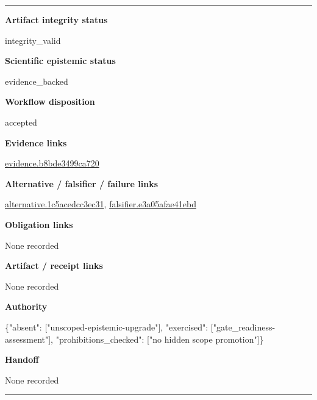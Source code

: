 \documentclass[10pt,a4paper]{article}
\newcommand{\TraceField}[2]{\par\noindent\textbf{#1}\par\noindent #2\par\smallskip}
\newenvironment{TraceDossier}{\par\medskip\noindent\hrule\medskip}{\medskip\hrule\par\medskip}
\begin{document}
\begin{TraceDossier}
\TraceField{Artifact integrity status}{integrity\_\allowbreak{}valid}

\TraceField{Scientific epistemic status}{evidence\_\allowbreak{}backed}

\TraceField{Workflow disposition}{accepted}

\TraceField{Evidence links}{\hyperlink{trace-evidence-8b260709dba789b7f5}{evidence.\allowbreak{}b8bde3499c\allowbreak{}a720}}

\TraceField{Alternative / falsifier / failure links}{\hyperlink{trace-alternative-4d037c4cc2fc7025d3}{alternativ\allowbreak{}e.\allowbreak{}1c5acedcc3\allowbreak{}ec31}, \hyperlink{trace-alternative-7d4cb1ab6ec072bc19}{falsifier.\allowbreak{}e3a05afae4\allowbreak{}1ebd}}

\TraceField{Obligation links}{None recorded}

\TraceField{Artifact / receipt links}{None recorded}

\TraceField{Authority}{\{"absent":\allowbreak{} ["unscoped\allowbreak{}-\allowbreak{}epistemic-\allowbreak{}upgrade"],\allowbreak{} "exercised\allowbreak{}":\allowbreak{} ["gate\_\allowbreak{}readiness-\allowbreak{}assessment\allowbreak{}"], "prohibiti\allowbreak{}ons\_\allowbreak{}checked":\allowbreak{} ["no hidden scope promotion"\allowbreak{}]\}}

\TraceField{Handoff}{None recorded}

\end{TraceDossier}
\end{document}
